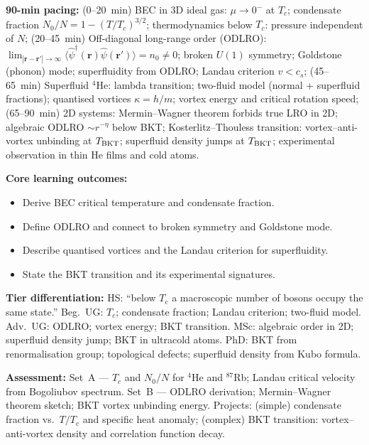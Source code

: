 \documentclass[11pt,a4paper]{article}
\begin{document}
\medskip

\begin{tcolorbox}[modulebox, title={Module~II.7 --- Lecture L04: Bose--Einstein Condensation and Superfluidity}]
\textbf{90-min pacing:} (0--20~min) BEC in 3D ideal gas: $\mu\to 0^-$ at $T_c$; condensate fraction $N_0/N=1-(T/T_c)^{3/2}$; thermodynamics below $T_c$: pressure independent of $N$; (20--45~min) Off-diagonal long-range order (ODLRO): $\lim_{|\mathbf{r}-\mathbf{r}'|\to\infty}\langle\hat\psi^\dagger(\mathbf{r})\hat\psi(\mathbf{r}')\rangle=n_0\neq 0$; broken $U(1)$ symmetry; Goldstone (phonon) mode; superfluidity from ODLRO; Landau criterion $v<c_s$; (45--65~min) Superfluid $^4$He: lambda transition; two-fluid model (normal + superfluid fractions); quantised vortices $\kappa=h/m$; vortex energy and critical rotation speed; (65--90~min) 2D systems: Mermin--Wagner theorem forbids true LRO in 2D; algebraic ODLRO $\sim r^{-\eta}$ below BKT; Kosterlitz--Thouless transition: vortex--anti-vortex unbinding at $T_{\rm BKT}$; superfluid density jumps at $T_{\rm BKT}$; experimental observation in thin He films and cold atoms.

\medskip\textbf{Core learning outcomes:}
\begin{itemize}[leftmargin=1.4em,topsep=2pt,itemsep=1pt]
  \item Derive BEC critical temperature and condensate fraction.
  \item Define ODLRO and connect to broken symmetry and Goldstone mode.
  \item Describe quantised vortices and the Landau criterion for superfluidity.
  \item State the BKT transition and its experimental signatures.
\end{itemize}

\medskip\textbf{Tier differentiation:}
HS: ``below $T_c$ a macroscopic number of bosons occupy the same state.''
Beg.\ UG: $T_c$; condensate fraction; Landau criterion; two-fluid model.
Adv.\ UG: ODLRO; vortex energy; BKT transition.
MSc: algebraic order in 2D; superfluid density jump; BKT in ultracold atoms.
PhD: BKT from renormalisation group; topological defects; superfluid density from Kubo formula.

\medskip\textbf{Assessment:}
Set~A --- $T_c$ and $N_0/N$ for $^4$He and $^{87}$Rb; Landau critical velocity from Bogoliubov spectrum.
Set~B --- ODLRO derivation; Mermin--Wagner theorem sketch; BKT vortex unbinding energy.
Projects: (simple) condensate fraction vs.\ $T/T_c$ and specific heat anomaly;
(complex) BKT transition: vortex--anti-vortex density and correlation function decay.
\end{tcolorbox}
\end{document}
